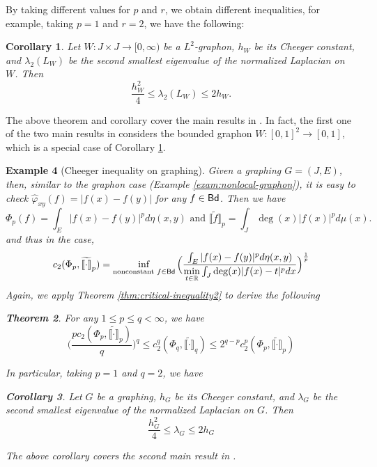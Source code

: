 \documentclass[12pt,a4paper]{article}
\newtheorem{theorem}{Theorem}[section]
\newtheorem{corollary}[theorem]{Corollary}
\newtheorem{example}[theorem]{Example}
\begin{document}
By taking different values for $p$ and $r$, we obtain different inequalities, for example, taking $p=1$ and $r=2$, we have the following:
\begin{corollary}\label{cor:WJ}
Let $W:J\times J\to [0,\infty)$ be a $L^2$-graphon, $h_W$ be its Cheeger constant, and $\lambda_2(L_W)$ be the second smallest eigenvalue of the normalized Laplacian on $W$. Then
$$ \frac{h^2_W}{4} \le \lambda_2(L_W) \le 2h_W.$$
\end{corollary}


The above theorem and corollary cover %
the main results in \cite{KM24}. In fact, the first one of the two main results in \cite{KM24} considers the bounded graphon $W:[0,1]^2\to[0,1]$, which is a special case of Corollary \ref{cor:WJ}. 


\begin{example}[Cheeger inequality on graphing]
Given a graphing $G=(J,E)$, %
then, similar to the graphon case (Example \ref{exam:nonlocal-graphon}), it is easy to check $\widehat{\varphi}_{xy}(f)=|f(x)-f(y)|$ for any $f\in{\sf Bd}$. Then we have
$$\Phi_p(f)=\int_E|f(x)-f(y)|^pd\eta(x,y)\text{ and }\widetilde{\llbracket f\rrbracket}_p=\int_J \deg(x)|f(x)|^pd\mu(x). $$
and thus in the case,
\begin{equation}\label{eq:Cheeger-c2pp-ing}
c_2(\Phi_p,\widetilde{\llbracket \cdot\rrbracket}_p)=\inf_{\text{nonconstant }f\in {\sf Bd}}\Big(\frac{\int_E|f(x)-f(y)|^pd\eta(x,y)}{\min\limits_{t\in\mathbb{R}}\int_{J} \deg(x)|f(x)-t|^pdx}\Big)^{\frac1p}
\end{equation}
Again, we  apply Theorem \ref{thm:critical-inequality2} to derive the following
\begin{theorem}\label{thm:Cheeger-graphing}
For any $1\le p\le q <\infty$, we have \begin{equation}\label{eq:p-Cheeger-ing}
\big(\frac{p c_2(\Phi_{p},\widetilde{\llbracket \cdot\rrbracket}_{p})}{q}\big)^q\le c_2^q(\Phi_q,\widetilde{\llbracket \cdot\rrbracket}_q)\le  2^{q-p}c_2^p(\Phi_{p},\widetilde{\llbracket \cdot\rrbracket}_{p})    
\end{equation}    
\end{theorem}
In particular, taking $p=1$ and $q=2$, we have
\begin{corollary}
Let $G$ be a graphing, $h_G$ be its Cheeger constant, and $\lambda_G$ be the second smallest eigenvalue of the normalized Laplacian on $G$. Then
$$ \frac{h^2_G}{4} \le \lambda_G \le 2h_G$$
\end{corollary}
The above corollary covers %
the second main result in \cite{KM24}.
\end{example}
\end{document}
